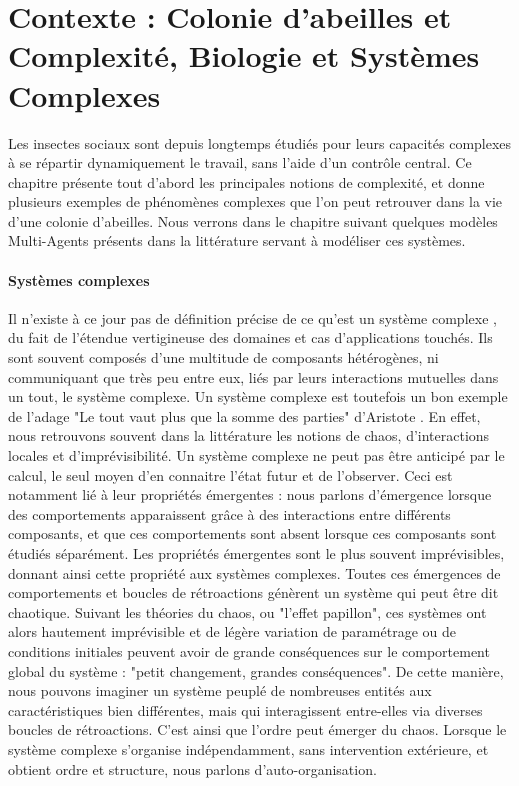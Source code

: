 \chapter*{Contexte : Colonie d'abeilles et Complexité, Biologie et Systèmes Complexes}
	\label{sectionBio}
	
	Les insectes sociaux sont depuis longtemps étudiés pour leurs capacités complexes à se répartir dynamiquement le travail, sans l'aide d'un contrôle central. Ce chapitre présente tout d'abord les principales notions de complexité, et donne plusieurs exemples de phénomènes complexes que l'on peut retrouver dans la vie d'une colonie d'abeilles. Nous verrons dans le chapitre suivant quelques modèles Multi-Agents présents dans la littérature servant à modéliser ces systèmes.

	
		\subsubsection{Systèmes complexes}
		
			Il n'existe à ce jour pas de définition précise de ce qu'est un système complexe \cite{heylighen_complexity_2008}, du fait de l'étendue vertigineuse des domaines et cas d'applications touchés. Ils sont souvent composés d'une multitude de composants hétérogènes, ni communiquant que très peu entre eux, liés par leurs interactions mutuelles dans un tout, le système complexe. Un système complexe est toutefois un bon exemple de l'adage "Le tout vaut plus que la somme des parties" d'Aristote \cite{edmonds_what_1999}. En effet, nous retrouvons souvent dans la littérature les notions de chaos, d'interactions locales et d'imprévisibilité. Un système complexe ne peut pas être anticipé par le calcul, le seul moyen d'en connaitre l'état futur et de l'observer. Ceci est notamment lié à leur propriétés émergentes : nous parlons d'émergence lorsque des comportements apparaissent grâce à des interactions entre différents composants, et que ces comportements sont absent lorsque ces composants sont étudiés séparément. Les propriétés émergentes sont le plus souvent imprévisibles, donnant ainsi cette propriété aux systèmes complexes. Toutes ces émergences de comportements et boucles de rétroactions génèrent un système qui peut être dit chaotique. Suivant les théories du chaos, ou "l'effet papillon", ces systèmes ont alors hautement imprévisible et de légère variation de paramétrage ou de conditions initiales peuvent avoir de grande conséquences sur le comportement global du système : "petit changement, grandes conséquences". De cette manière, nous pouvons imaginer un système peuplé de nombreuses entités aux caractéristiques bien différentes, mais qui interagissent entre-elles via diverses boucles de rétroactions. C'est ainsi que l'ordre peut émerger du chaos. Lorsque le système complexe s'organise indépendamment, sans intervention extérieure, et obtient ordre et structure, nous parlons d'auto-organisation.
			
